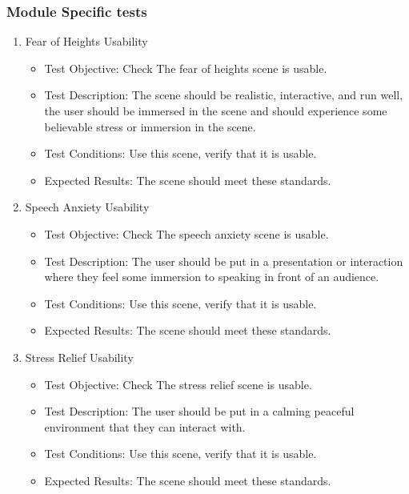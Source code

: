 \documentclass[a4paper,10pt]{article}
\begin{document}
\subsubsection{Module Specific tests}
\begin{enumerate}
    \item  Fear of Heights Usability
     \begin{itemize}
	\item Test Objective: Check The fear of heights scene is usable.
	\item Test Description: The scene should be realistic, interactive, and run well, the user should be immersed in 
	the scene and should experience some believable stress or immersion in the scene.
	\item Test Conditions: Use this scene, verify that it is usable.
	\item Expected Results: The scene should meet these standards.
    \end{itemize}
    \item  Speech Anxiety Usability
     \begin{itemize}
	\item Test Objective: Check The speech anxiety  scene is usable.
	\item Test Description: The user should be put in a presentation or interaction where they feel some immersion to speaking in front of an audience.
	\item Test Conditions: Use this scene, verify that it is usable.
	\item Expected Results: The scene should meet these standards.
    \end{itemize}
    \item  Stress Relief Usability
     \begin{itemize}
	\item Test Objective: Check The stress relief scene is usable.
	\item Test Description: The user should be put in a calming peaceful environment that they can interact with.
	\item Test Conditions: Use this scene, verify that it is usable.
	\item Expected Results: The scene should meet these standards.
    \end{itemize}
    

\end{enumerate}
\pagebreak

\end{document}
